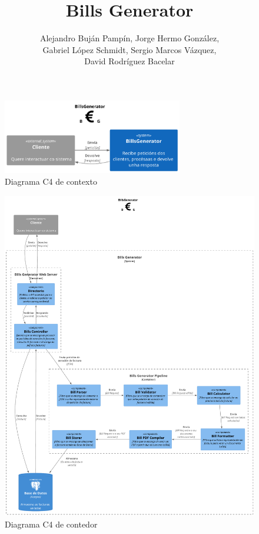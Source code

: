 \documentclass[galician]{article}
\title{Bills Generator}
\author{Alejandro Buján Pampín, Jorge Hermo González, \\ Gabriel López Schmidt, Sergio Marcos Vázquez,\\ David Rodríguez Bacelar}
\date{}
\begin{document}
\maketitle

\begin{figure}[ht!]
	\centering
	\includegraphics[width=0.7\textwidth]{bills_generator_context.pdf}
	\caption{Diagrama C4 de contexto}
	\label{fig:context}
\end{figure}

\begin{figure}[ht!]
	\centering
	\includegraphics[width=1.0\textwidth]{bills_generator_container.pdf}
	\caption{Diagrama C4 de contedor}
	\label{fig:container}
\end{figure}
\end{document}
